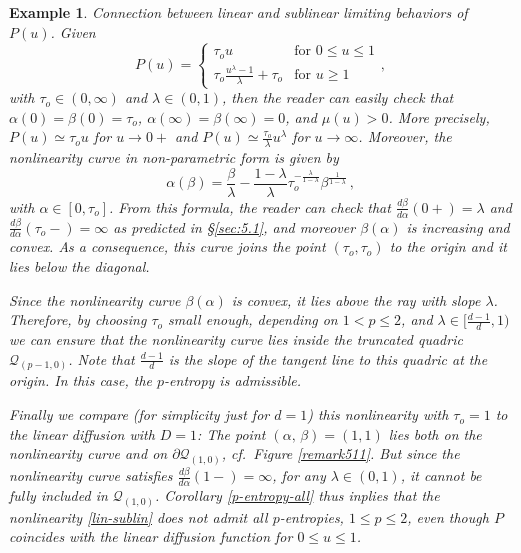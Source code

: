 \documentclass[reqno]{amsart}
\newtheorem{example}[lemma]{Example}
\begin{document}
\begin{example}\label{exnon2}
\emph{Connection between linear and sublinear limiting behaviors of $P(u)$.} Given 
\begin{equation}\label{lin-sublin}
P(u)=\left\{\begin{array}{cl} 
\tau_o u & \mbox{for } 0\leq u\leq 1\\[2mm]
\tau_o\frac{u^{\lambda}-1}{\lambda}+\tau_o & \mbox{for } u\geq 1
\end{array}\right. ,  
\end{equation}
with $\tau_o\in (0,\infty)$ and $\lambda\in (0,1)$, then the reader can easily check that
$\alpha(0)=\beta(0)=\tau_o$,  $\alpha(\infty)=\beta(\infty)=0$, and $\mu(u)>0$. 
More precisely, $P(u)\simeq \tau_o u$ for $u\to 0+$ and $P(u)\simeq \tfrac{\tau_o}{\lambda} u^\lambda$ for $u\to\infty$.
Moreover, the nonlinearity curve in non-parametric form is given by 
$$
\alpha(\beta)=\frac{\beta}{\lambda}-\frac{1-\lambda}{\lambda}\tau_o^{-\tfrac{\lambda}{1-\lambda}} \beta^{\tfrac1{1-\lambda}}\,,
$$
with $\alpha\in[0,\tau_o]$. From this formula, the reader can check that $\frac{d\beta}{d\alpha}(0+)=\lambda$ and $\frac{d\beta}{d\alpha}(\tau_o-)=\infty$ as predicted in \S\ref{sec:5.1}, and moreover $\beta(\alpha)$ is increasing and convex. As a consequence, this curve joins the point $(\tau_o,\tau_o)$ to the origin and it lies below the diagonal. 

Since the nonlinearity curve $\beta(\alpha)$ is convex, it lies above the ray with slope $\lambda$. Therefore, by choosing $\tau_o$ small enough, depending on $1<p\le 2$,  and $\lambda \in [\frac{d-1}{d},1)$ we can ensure that the nonlinearity curve lies inside the truncated quadric $\mathcal{Q}_{(p-1,0)}$. Note that $\frac{d-1}{d}$ is the slope of the tangent line to this quadric at the origin. In this case, the $p$-entropy is admissible. 

Finally we compare (for simplicity just for $d=1$) this nonlinearity with $\tau_o=1$ to the linear diffusion with $D=1$: The point $(\alpha,\,\beta)=(1,1)$ lies both on the nonlinearity curve and on $\partial\mathcal{Q}_{(1,0)}$, cf.\ Figure \ref{remark511}.  But since the nonlinearity curve satisfies $\frac{d\beta}{d\alpha}(1-)=\infty$, for any $\lambda\in(0,1)$, it cannot be fully included in $\mathcal{Q}_{(1,0)}$. Corollary \ref{p-entropy-all} thus inplies that the nonlinearity \eqref{lin-sublin} does \emph{not} admit all $p$-entropies, $1\le p\le2$, even though $P$ coincides with the linear diffusion function for $0\le u\le1$.
\end{example}
\end{document}
